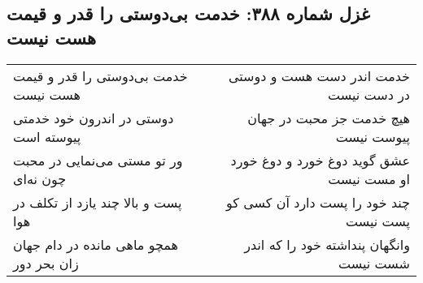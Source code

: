 \begin{center}
\section*{غزل شماره ۳۸۸: خدمت بی‌دوستی را قدر و قیمت هست نیست}
\label{sec:0388}
\begin{longtable}{l p{0.5cm} r}
خدمت بی‌دوستی را قدر و قیمت هست نیست
&&
خدمت اندر دست هست و دوستی در دست نیست
\\
دوستی در اندرون خود خدمتی پیوسته است
&&
هیچ خدمت جز محبت در جهان پیوست نیست
\\
ور تو مستی می‌نمایی در محبت چون نه‌ای
&&
عشق گوید دوغ خورد و دوغ خورد او مست نیست
\\
پست و بالا چند یازد از تکلف در هوا
&&
چند خود را پست دارد آن کسی کو پست نیست
\\
همچو ماهی مانده در دام جهان زان بحر دور
&&
وانگهان پنداشته خود را که اندر شست نیست
\\
\end{longtable}
\end{center}
